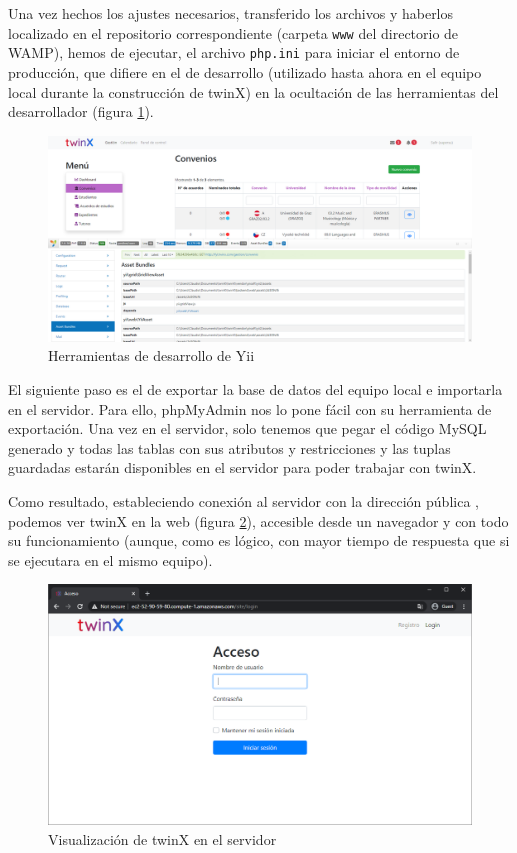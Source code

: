 Una vez hechos los ajustes necesarios, transferido los archivos y haberlos localizado en el repositorio correspondiente (carpeta \texttt{www} del directorio de WAMP), hemos de ejecutar, el archivo \texttt{php.ini} para iniciar el entorno de producción, que difiere en el de desarrollo (utilizado hasta ahora en el equipo local durante la construcción de twinX) en la ocultación de las herramientas del desarrollador (figura \ref{fig:herramientasdesarrollo}).

\begin{figure}
	\centering
	\includegraphics[width=\linewidth]{img/herramientas_desarrollo}
	\caption{Herramientas de desarrollo de Yii}
	\label{fig:herramientasdesarrollo}
\end{figure}

El siguiente paso es el de exportar la base de datos del equipo local e importarla en el servidor. Para ello, phpMyAdmin nos lo pone fácil con su herramienta de exportación. Una vez en el servidor, solo tenemos que pegar el código MySQL generado y todas las tablas con sus atributos y restricciones y las tuplas guardadas estarán disponibles en el servidor para poder trabajar con twinX.

Como resultado, estableciendo conexión al servidor con la dirección pública \cite{twinx}, podemos ver twinX en la web (figura \ref{fig:twinx}), accesible desde un navegador y con todo su funcionamiento (aunque, como es lógico, con mayor tiempo de respuesta que si se ejecutara en el mismo equipo).

\begin{figure}
	\centering
	\includegraphics[width=\linewidth]{img/twinx_desplegado}
	\caption{Visualización de twinX en el servidor}
	\label{fig:twinx}
\end{figure}

